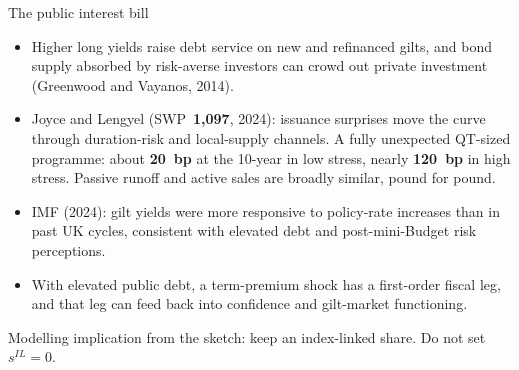 \documentclass[11pt,aspectratio=169]{beamer}
\begin{document}
\begin{frame}{The public interest bill}
  \begin{itemize}
    \item Higher long yields raise debt service on new and refinanced
          gilts, and bond supply absorbed by risk-averse investors can
          crowd out private investment
          (Greenwood and Vayanos, 2014).
    \item Joyce and Lengyel (SWP~\textbf{1,097}, 2024): issuance
          surprises move the curve through duration-risk and local-supply
          channels. A fully unexpected QT-sized programme:
          about \textbf{20~bp} at the 10-year in low stress, nearly
          \textbf{120~bp} in high stress. Passive runoff and active
          sales are broadly similar, pound for pound.
    \item IMF (2024): gilt yields were more responsive to policy-rate
          increases than in past UK cycles, consistent with elevated
          debt and post-mini-Budget risk perceptions.
    \item With elevated public debt, a term-premium shock has a
          first-order fiscal leg, and that leg can feed back into
          confidence and gilt-market functioning.
  \end{itemize}
  \vspace{0.3em}
  {\footnotesize Modelling implication from the sketch: keep an
  index-linked share. Do not set $s^{IL}=0$.}
\end{frame}
\end{document}
